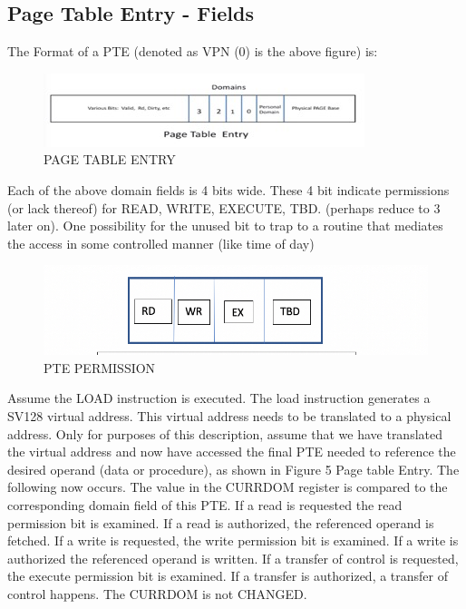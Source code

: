 \documentclass{article}
\begin{document}
\pagebreak

\subsection{Page Table Entry - Fields}

The Format of a PTE (denoted as VPN (0) is the above figure) is:

\begin{figure}[h]
\begin{center}
\includegraphics[scale=.8]{figures/figure2b_pte.jpg}
\caption{PAGE TABLE ENTRY}
\end{center}
\end{figure}

Each of the above domain fields is 4 bits wide.  These 4 bit indicate permissions (or lack thereof) for READ,  WRITE,  EXECUTE,  TBD. (perhaps reduce to 3 later on). One possibility for the unused bit to trap to a routine that mediates the access in some controlled  manner (like time of day)

\begin{figure}[h]\begin{center}
\includegraphics[scale=.4]
{figures/figure5a_domain_permissions.jpg}
\caption{PTE PERMISSION}
\centering
\end{center}
\end{figure}

Assume the LOAD instruction is executed.  The load instruction generates a SV128 virtual address.  This virtual address needs to be translated to a physical address.  Only for purposes of this description, assume that we have translated the virtual address and now have accessed the final PTE needed to reference the desired operand (data or procedure), as shown in Figure 5 Page table Entry.   The following now occurs.  The value in the CURRDOM register is compared to the corresponding domain field of this PTE.   If a read is requested the read permission bit is examined.  If a read is authorized,  the referenced operand is fetched.  If a write is requested,  the write permission bit is examined.  If a write is authorized the referenced operand is written.  If a transfer of control is requested,  the execute permission bit is examined.  If  a transfer is authorized,  a transfer of control happens.  The CURRDOM is not  CHANGED.
\end{document}
